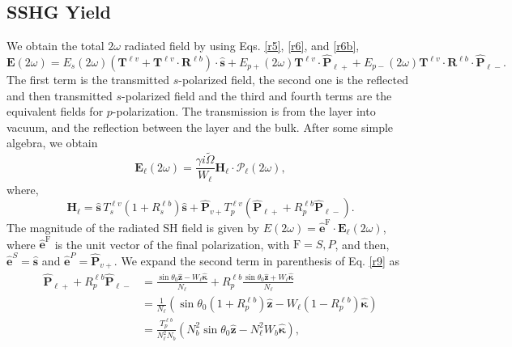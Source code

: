 
\subsection{SSHG Yield}\label{sec:yield}

We obtain the total $2\omega$ radiated field by using Eqs. \eqref{r5},
\eqref{r6}, and \eqref{r6b},
\begin{equation*}\label{r7}
\mathbf{E}(2\omega)
= E_s(2\omega)
\left(
\mathbf{T}^{\ell v} + \mathbf{T}^{\ell v}\cdot\mathbf{R}^{\ell b}
\right)
\cdot\hat{\mathbf{s}}
+ E_{p+}(2\omega)\mathbf{T}^{\ell v}\cdot\hat{\mathbf{P}}_{\ell +}
 + E_{p-}(2\omega)\mathbf{T}^{\ell v}
\cdot\mathbf{R}^{\ell b}\cdot\hat{\mathbf{P}}_{\ell-}.
\end{equation*}
The first term is  the transmitted $s$-polarized field, the second one is the
reflected and then transmitted $s$-polarized field and the third and fourth
terms are the equivalent fields for $p$-polarization. The transmission is from
the layer into vacuum, and the reflection between the layer and the bulk. After
some simple algebra, we obtain
\begin{equation}\label{r8}
\mathbf{E}_{\ell}(2\omega) = \frac{\gamma i\tilde{\Omega}}{W_{\ell}}
\mathbf{H}_{\ell}\cdot\boldsymbol{\mathcal{P}}_\ell(2\omega),
\end{equation}
where,
\begin{equation}\label{r9}
\mathbf{H}_{\ell}
= \hat{\mathbf{s}}\,T_s^{\ell v}\left(1+R_s^{\ell b}\right)\hat{\mathbf{s}}
+ \hat{\mathbf{P}}_{v+}T_{p}^{\ell v}
\left(
\hat{\mathbf{P}}_{\ell +} +R_{p}^{\ell b}\hat{\mathbf{P}}_{\ell -}
\right). 
\end{equation}
The magnitude of the radiated SH field is given by
$E(2\omega)=\hat{\mathbf{e}}^{\mathrm{F}}\cdot\mathbf{E}_\ell(2\omega)$, where
$\hat{\mathbf{e}}^{\mathrm{F}}$ is the unit vector of the final polarization,
with $\mathrm{F}=S,P$, and then, $\hat{\mathbf{e}}^S=\hat{\mathbf{s}}$ and
$\hat{\mathbf{e}}^P=\hat{\mathbf{P}}_{v+}$. We expand the second term in
parenthesis of Eq. \eqref{r9} as
\begin{equation*}\label{m1}
\begin{split}
\hat{\mathbf{P}}_{\ell +} + R_{p}^{\ell b}\hat{\mathbf{P}}_{\ell -}
&= \frac{\sin\theta_{0}\hat{\mathbf{z}} - W_{\ell}\hat{\boldsymbol{\kappa}}}
        {N_{\ell}}
 + R_{p}^{\ell b}
   \frac{\sin\theta_{0}\hat{\mathbf{z}} + W_{\ell}\hat{\boldsymbol{\kappa}}}
        {N_{\ell}}
\\\nonumber
&= \frac{1}{N_{\ell}}
\left(
\sin\theta_{0}(1+R^{\ell b}_{p})\hat{\mathbf{z}}
- W_{\ell}(1-R^{\ell b}_{p})\hat{\boldsymbol{\kappa}} 
\right)
\\\nonumber 
&= \frac{T^{\ell b}_{p}}{N^{2}_{\ell}N_{b}}
\left(
  N^{2}_{b}\sin\theta_{0}\hat{\mathbf{z}} 
- N^{2}_{\ell}W_{b}\hat{\boldsymbol{\kappa}}
\right)
,
\end{split}
\end{equation*}
